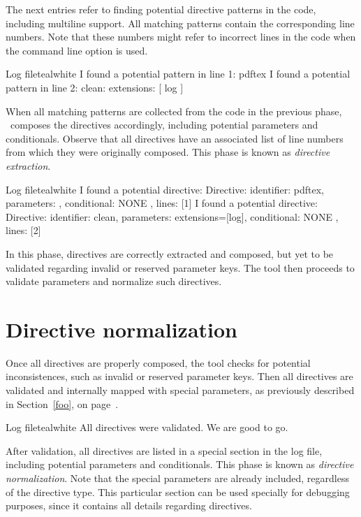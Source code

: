 The next entries refer to finding potential directive patterns in the code, including multiline support. All matching patterns contain the corresponding line numbers. Note that these numbers might refer to incorrect lines in the code when the  command line option is used.

\begin{codebox}{Log file}{teal}{\icnote}{white}
I found a potential pattern in line 1: pdftex
I found a potential pattern in line 2: clean: { extensions: [ log ] }
\end{codebox}

When all matching patterns are collected from the code in the previous phase, \arara\ composes the directives accordingly, including potential parameters and conditionals. Observe that all directives have an associated list of line numbers from which they were originally composed. This phase is known as \emph{directive extraction}.

\begin{codebox}{Log file}{teal}{\icnote}{white}
I found a potential directive: Directive: { identifier: pdftex,
parameters: {}, conditional: { NONE }, lines: [1] }
I found a potential directive: Directive: { identifier: clean,
parameters: {extensions=[log]}, conditional: { NONE }, lines: [2] }
\end{codebox}

In this phase, directives are correctly extracted and composed, but yet to be validated regarding invalid or reserved parameter keys. The tool then proceeds to validate parameters and normalize such directives.

\section{Directive normalization}
\label{sec:directivenormalization}

Once all directives are properly composed, the tool checks for potential inconsistences, such as invalid or reserved parameter keys. Then all directives are validated and internally mapped with special parameters, as previously described in Section~\ref{foo}, on page~\pageref{foo}.

\begin{codebox}{Log file}{teal}{\icnote}{white}
All directives were validated. We are good to go.
\end{codebox}

After validation, all directives are listed in a special section in the log file, including potential parameters and conditionals. This phase is known as \emph{directive normalization}. Note that the special parameters are already included, regardless of the directive type.  This particular section can be used specially for debugging purposes, since it contains all details regarding directives.

